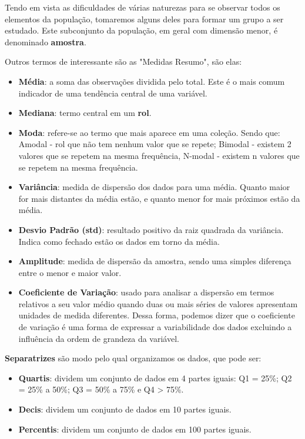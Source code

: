 Tendo em vista as dificuldades de várias naturezas para se observar todos os elementos da população, tomaremos alguns deles para formar um grupo a ser estudado. Este subconjunto da população, em geral com dimensão menor, é denominado \textbf{amostra}.

Outros termos de interessante são as "Medidas Resumo", são elas:
\begin{itemize}
	\item \textbf{Média}: a soma das observações dividida pelo total. Este é o mais comum indicador de uma tendência central de uma variável.
	\item \textbf{Mediana}: termo central em um \textbf{rol}.
	\item \textbf{Moda}: refere-se ao termo que mais aparece em uma coleção. Sendo que: Amodal - rol que não tem nenhum valor que se repete; Bimodal - existem 2 valores que se repetem na mesma frequência, N-modal - existem n valores que se repetem na mesma frequência.
	\item \textbf{Variância}: medida de dispersão dos dados para uma média. Quanto maior for mais distantes da média estão, e quanto menor for mais próximos estão da média.
	\item \textbf{Desvio Padrão (std)}: resultado positivo da raiz quadrada da variância. Indica como fechado estão os dados em torno da média.
	\item \textbf{Amplitude}: medida de dispersão da amostra, sendo uma simples diferença entre o menor e maior valor.
	\item \textbf{Coeficiente de Variação}: usado para analisar a dispersão em termos relativos a seu valor médio quando duas ou mais séries de valores apresentam unidades de medida diferentes. Dessa forma, podemos dizer que o coeficiente de variação é uma forma de expressar a variabilidade dos dados excluindo a influência da ordem de grandeza da variável.
\end{itemize}

\textbf{Separatrizes} são modo pelo qual organizamos os dados, que pode ser:
\begin{itemize}
	\item \textbf{Quartis}: dividem um conjunto de dados em 4 partes iguais: Q1 = 25\%; Q2 = 25\% a 50\%; Q3 = 50\% a 75\% e Q4 > 75\%.
	\item \textbf{Decis}: dividem um conjunto de dados em 10 partes iguais.
	\item \textbf{Percentis}: dividem um conjunto de dados em 100 partes iguais.
\end{itemize}


